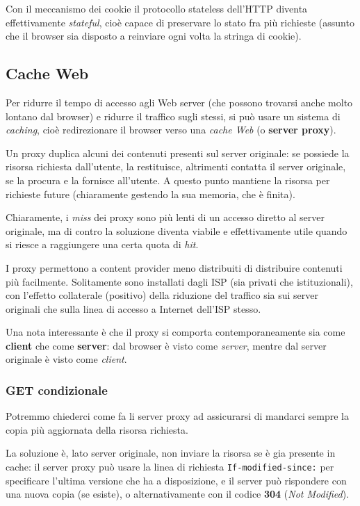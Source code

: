 \documentclass[a4paper,11pt]{article}
\begin{document}
Con il meccanismo dei cookie il protocollo stateless dell'HTTP diventa effettivamente \textit{stateful}, cioè capace di preservare lo stato fra più richieste (assunto che il browser sia disposto a reinviare ogni volta la stringa di cookie).

\subsection{Cache Web}
Per ridurre il tempo di accesso agli Web server (che possono trovarsi anche molto lontano dal browser) e ridurre il traffico sugli stessi, si può usare un sistema di \textit{caching}, cioè redirezionare il browser verso una \textit{cache Web} (o \textbf{server proxy}).

Un proxy duplica alcuni dei contenuti presenti sul server originale: se possiede la risorsa richiesta dall'utente, la restituisce, altrimenti contatta il server originale, se la procura e la fornisce all'utente. A questo punto mantiene la risorsa per richieste future (chiaramente gestendo la sua memoria, che è finita).

Chiaramente, i \textit{miss} dei proxy sono più lenti di un accesso diretto al server originale, ma di contro la soluzione diventa viabile e effettivamente utile quando si riesce a raggiungere una certa quota di \textit{hit}.

I proxy permettono a content provider meno distribuiti di distribuire contenuti più facilmente.
Solitamente sono installati dagli ISP (sia privati che istituzionali), con l'effetto collaterale (positivo) della riduzione del traffico sia sui server originali che sulla linea di accesso a Internet dell'ISP stesso.

Una nota interessante è che il proxy si comporta contemporaneamente sia come \textbf{client} che come \textbf{server}: dal browser è visto come \textit{server}, mentre dal server originale è visto come \textit{client}.

\subsubsection{GET condizionale}
Potremmo chiederci come fa li server proxy ad assicurarsi di mandarci sempre la copia più aggiornata della risorsa richiesta.

La soluzione è, lato server originale, non inviare la risorsa se è gia presente in cache: il server proxy può usare la linea di richiesta \lstinline|If-modified-since:| per specificare l'ultima versione che ha a disposizione, e il server può rispondere con una nuova copia (se esiste), o alternativamente con il codice \textbf{304} (\textit{Not Modified}).
\end{document}
